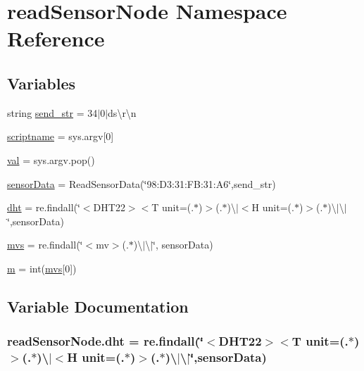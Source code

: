 \hypertarget{namespacereadSensorNode}{}\section{read\+Sensor\+Node Namespace Reference}
\label{namespacereadSensorNode}
\subsection*{Variables}
\begin{DoxyCompactItemize}
\item 
string \hyperlink{namespacereadSensorNode_af709b4a0649a2ea9861b259a849678b4}{send\+\_\+str} = \textquotesingle{}34$\vert$0$\vert$ds\textbackslash{}r\textbackslash{}n\textquotesingle{}
\item 
\hyperlink{namespacereadSensorNode_acade05a74d18b0ee0e6f280ad09d687f}{scriptname} = sys.\+argv\mbox{[}0\mbox{]}
\item 
\hyperlink{namespacereadSensorNode_a6402c2b5b9511b1753751a57999229db}{val} = sys.\+argv.\+pop()
\item 
\hyperlink{namespacereadSensorNode_ad6357a640d5eeb83da28688160844249}{sensor\+Data} = Read\+Sensor\+Data(\char`\"{}98\+:D3\+:31\+:\+F\+B\+:31\+:\+A6\char`\"{},send\+\_\+str)
\item 
\hyperlink{namespacereadSensorNode_aacb56f7a4c0fd89326dc4540e886f618}{dht} = re.\+findall(\char`\"{}$<$D\+H\+T22$>$$<$T unit=\textquotesingle{}(.$\ast$)\textquotesingle{}$>$(.$\ast$)\textbackslash{}$\vert$$<$H unit=\textquotesingle{}(.$\ast$)\textquotesingle{}$>$(.$\ast$)\textbackslash{}$\vert$\textbackslash{}$\vert$\char`\"{},sensor\+Data)
\item 
\hyperlink{namespacereadSensorNode_a7746a922c2180be4998ed3a6f2ea55c6}{mvs} = re.\+findall(\char`\"{}$<$mv$>$(.$\ast$)\textbackslash{}$\vert$\textbackslash{}$\vert$\char`\"{}, sensor\+Data)
\item 
\hyperlink{namespacereadSensorNode_a71804d993bcdc7ce54f096240e107167}{m} = int(\hyperlink{namespacereadSensorNode_a7746a922c2180be4998ed3a6f2ea55c6}{mvs}\mbox{[}0\mbox{]})
\end{DoxyCompactItemize}


\subsection{Variable Documentation}
\subsubsection[{\texorpdfstring{dht}{dht}}]{\setlength{\rightskip}{0pt plus 5cm}read\+Sensor\+Node.\+dht = re.\+findall(\char`\"{}$<$D\+H\+T22$>$$<$T unit=\textquotesingle{}(.$\ast$)\textquotesingle{}$>$(.$\ast$)\textbackslash{}$\vert$$<$H unit=\textquotesingle{}(.$\ast$)\textquotesingle{}$>$(.$\ast$)\textbackslash{}$\vert$\textbackslash{}$\vert$\char`\"{},sensor\+Data)}\hypertarget{namespacereadSensorNode_aacb56f7a4c0fd89326dc4540e886f618}{}\label{namespacereadSensorNode_aacb56f7a4c0fd89326dc4540e886f618}
